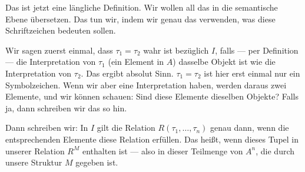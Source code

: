 \begin{math-stroke}
\end{math-stroke}

\begin{spoken-clean}[01:06:57 - 01:09:17]
Das ist jetzt eine längliche Definition. Wir wollen all das in die semantische Ebene übersetzen. Das tun wir, indem wir genau das verwenden, was diese Schriftzeichen bedeuten sollen.

Wir sagen zuerst einmal, dass $\tau_1 = \tau_2$ wahr ist bezüglich $I$, falls --- per Definition --- die Interpretation von $\tau_1$ (ein Element in $A$) dasselbe Objekt ist wie die Interpretation von $\tau_2$. Das ergibt absolut Sinn. $\tau_1 = \tau_2$ ist hier erst einmal nur ein Symbolzeichen. Wenn wir aber eine Interpretation haben, werden daraus zwei Elemente, und wir können schauen: Sind diese Elemente dieselben Objekte? Falls ja, dann schreiben wir das so hin.

Dann schreiben wir: In $I$ gilt die Relation $R(\tau_1, \dots, \tau_n)$ genau dann, wenn die entsprechenden Elemente diese Relation erfüllen. Das heißt, wenn dieses Tupel in unserer Relation $R^M$ enthalten ist --- also in dieser Teilmenge von $A^n$, die durch unsere Struktur $M$ gegeben ist.
\end{spoken-clean}

